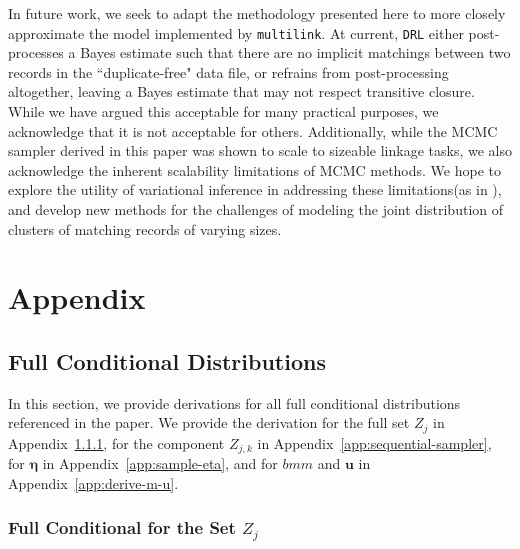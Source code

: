 \documentclass[12pt,letterpaper]{article}
\newcommand{\1}[1]{\mathbb{I}\!\left[#1\right]} %
\begin{document}
In future work, we seek to adapt the methodology presented here to more closely approximate the model implemented by \texttt{multilink}. At current, \texttt{DRL} either post-processes a Bayes estimate such that there are no implicit matchings between two records in the ``duplicate-free" data file, or refrains from post-processing altogether, leaving a Bayes estimate that may not respect transitive closure. While we have argued this acceptable for many practical purposes, we acknowledge that it is not acceptable for others. Additionally, while the MCMC sampler derived in this paper was shown to scale to sizeable linkage tasks, we also acknowledge the inherent scalability limitations of MCMC methods. We hope to explore the utility of variational inference in addressing these limitations(as in \cite{kundinger_2024_vabl}), and develop new methods for the challenges of modeling the joint distribution of clusters of matching records of varying sizes. 

\pagebreak



\pagebreak

\section{Appendix}
\label{sec:appendix}

\subsection{Full Conditional Distributions} \label{app:full-conditionals}

In this section, we provide derivations for all full conditional distributions referenced in the paper. We provide the derivation for the full set $Z_j$ in Appendix~\ref{app:joint-distribution}, for the component $Z_{j,k}$ in Appendix~\ref{app:sequential-sampler}, for $\bm{\eta}$ in Appendix~\ref{app:sample-eta}, and for $bm{m}$ and $\bm{u}$ in Appendix~\ref{app:derive-m-u}.

\subsubsection{Full Conditional for the Set $Z_j$} \label{app:joint-distribution}
\end{document}

